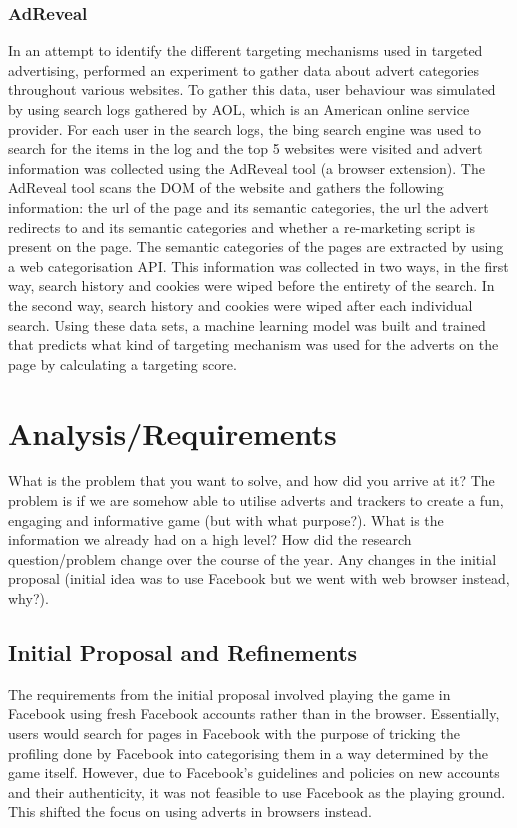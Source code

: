 \documentclass{l4proj}
\begin{document}
\subsection{AdReveal}
In an attempt to identify the different targeting mechanisms used in targeted advertising, \cite{Liu2013} performed an experiment to gather data about advert categories throughout various websites. To gather this data, user behaviour was simulated by using search logs gathered by AOL, which is an American online service provider. 
For each user in the search logs, the bing search engine was used to search for the items in the log and the top 5 websites were visited and advert information was collected using the AdReveal tool (a browser extension). The AdReveal tool scans the DOM of the website and gathers the following information: the url of the page and its semantic categories, the url the advert redirects to and its semantic categories and whether a re-marketing script is present on the page. The semantic categories of the pages are extracted by using a web categorisation API. 
This information was collected in two ways, in the first way, search history and cookies were wiped before the entirety of the search. In the second way, search history and cookies were wiped after each individual search. Using these data sets, a machine learning model was built and trained that predicts what kind of targeting mechanism was used for the adverts on the page by calculating a targeting score.

\chapter{Analysis/Requirements}
What is the problem that you want to solve, and how did you arrive at it?
The problem is if we are somehow able to utilise adverts and trackers to create a fun, engaging and informative game (but with what purpose?). What is the information we already had on a high level? How did the research question/problem change over the course of the year. Any changes in the initial proposal (initial idea was to use Facebook but we went with web browser instead, why?).

\section{Initial Proposal and Refinements}
The requirements from the initial proposal involved playing the game in Facebook using fresh Facebook accounts rather than in the browser. Essentially, users would search for pages in Facebook with the purpose of tricking the profiling done by Facebook into categorising them in a way determined by the game itself. However, due to Facebook's guidelines and policies on new accounts and their authenticity, it was not feasible to use Facebook as the playing ground. This shifted the focus on using adverts in browsers instead.
\end{document}
